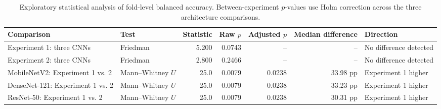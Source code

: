 \begin{table}[t]
\caption{Exploratory statistical analysis of fold-level balanced accuracy. Between-experiment $p$-values use Holm correction across the three architecture comparisons.}
\label{tab:bcc-statistical-analysis}
\centering
\small
\begin{tabularx}{\textwidth}{@{}XlrrrrX@{}}
\toprule
Comparison & Test & Statistic & Raw $p$ & Adjusted $p$ & Median difference & Direction \\
\midrule
Experiment 1: three CNNs & Friedman & 5.200 & 0.0743 & -- & -- & No difference detected \\
Experiment 2: three CNNs & Friedman & 2.800 & 0.2466 & -- & -- & No difference detected \\
\midrule
MobileNetV2: Experiment 1 vs. 2 & Mann--Whitney $U$ & 25.0 & 0.0079 & 0.0238 & 33.98 pp & Experiment 1 higher \\
DenseNet-121: Experiment 1 vs. 2 & Mann--Whitney $U$ & 25.0 & 0.0079 & 0.0238 & 33.23 pp & Experiment 1 higher \\
ResNet-50: Experiment 1 vs. 2 & Mann--Whitney $U$ & 25.0 & 0.0079 & 0.0238 & 30.31 pp & Experiment 1 higher \\
\bottomrule
\end{tabularx}
\end{table}
